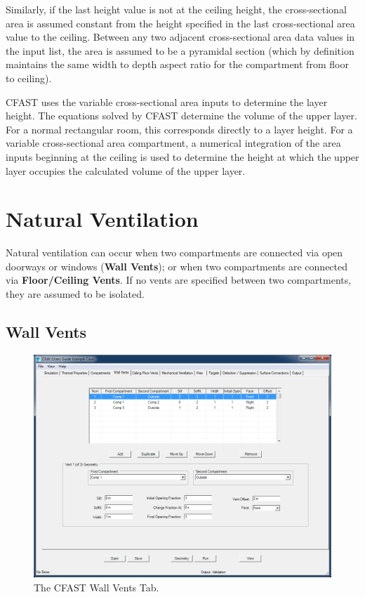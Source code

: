 Similarly, if the last height value is not at the ceiling height, the cross-sectional area is assumed constant from the height specified in the last cross-sectional area value to the ceiling. Between any two adjacent cross-sectional area data values in the input list, the area is assumed to be a pyramidal section (which by definition maintains the same width to depth aspect ratio for the compartment from floor to ceiling).

CFAST uses the variable cross-sectional area inputs to determine the layer height. The equations solved by CFAST determine the volume of the upper layer. For a normal rectangular room, this corresponds directly to a layer height. For a variable cross-sectional area compartment, a numerical integration of the area inputs beginning at the ceiling is used to determine the height at which the upper layer occupies the calculated volume of the upper layer.






\chapter{Natural Ventilation}

Natural ventilation can occur when two compartments are connected via open doorways or windows (\textbf{Wall Vents}); or when two compartments are connected via \textbf{Floor/Ceiling Vents}. If no vents are specified between two compartments, they are assumed to be isolated.

\section{Wall Vents}

\begin{figure}[h!]
\begin{center}
\includegraphics[width=6.5in]{FIGURES/Natural_Flow_Tab}
\caption[The CFAST Wall Vents Tab]{The CFAST Wall Vents Tab.}
\end{center}
\end{figure}

